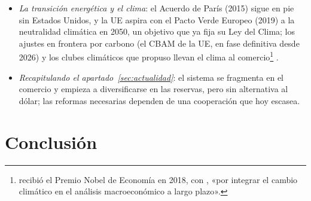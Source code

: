\documentclass[11pt]{article}
\begin{document}
\begin{itemize}
\item \emph{La transición energética y el clima}: el Acuerdo de París (2015) sigue en pie sin Estados Unidos, y la UE aspira con el Pacto Verde Europeo (2019) a la neutralidad climática en 2050, un objetivo que ya fija su Ley del Clima; los ajustes en frontera por carbono (el CBAM de la UE, en fase definitiva desde 2026) y los clubes climáticos que propuso  llevan el clima al comercio\footnote{ recibió el Premio Nobel de Economía en 2018, con , «por integrar el cambio climático en el análisis macroeconómico a largo plazo»\nocite{Nobel2018Nordhaus}.} .
\item \emph{Recapitulando el apartado~\ref{sec:actualidad}}: el sistema se fragmenta en el comercio y empieza a diversificarse en las reservas, pero sin alternativa al dólar; las reformas necesarias dependen de una cooperación que hoy escasea.
\end{itemize}

\section*{Conclusión}
\end{document}
